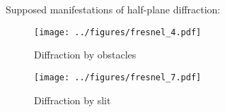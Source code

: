 Supposed manifestations of half-plane diffraction:

\begin{figure}[h]
    \begin{minipage}{0.48\textwidth}
            \hspace{-0.5cm}
            \texttt{[image: ../figures/fresnel\_4.pdf]}
            \vspace{-1.2cm}
            \caption{Diffraction by obstacles}
    \end{minipage}
    \hfill
    \begin{minipage}{0.48\textwidth}
        \hspace{-0.5cm}
        \texttt{[image: ../figures/fresnel\_7.pdf]}
        \vspace{-1.2cm}
        \caption{Diffraction by slit}
    \end{minipage}
\end{figure}

